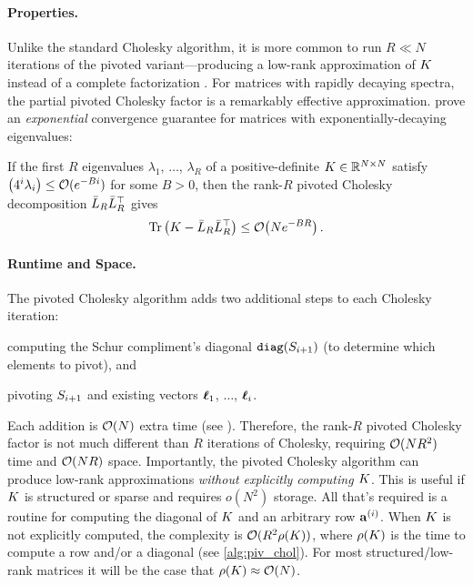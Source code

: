 \paragraph{Properties.}
Unlike the standard Cholesky algorithm, it is more common to run $R \ll N$ iterations of the pivoted variant---producing a low-rank approximation of $K$ instead of a complete factorization \cite{harbrecht2012low}.
For matrices with rapidly decaying spectra, the partial pivoted Cholesky factor is a remarkably effective approximation.
\citet{harbrecht2012low} prove an \emph{exponential} convergence guarantee for matrices with exponentially-decaying eigenvalues:
%
\begin{theorem}
\label{thm:harbrecht}
  If the first $R$ eigenvalues $\lambda_1$, $\ldots$, $\lambda_R$ of a positive-definite $K \in \mathbb{R}^{N \times N}$ satisfy $\left( 4^{i}\lambda_{i} \right) \leq \bigo{e^{-Bi}}$ for some $B>0$,
  then the rank-$R$ pivoted Cholesky decomposition $\bar{L}_{R} \bar{L}_R^\top$ gives
  \[
    \tr{\bK -  \bar\bL_R \bar\bL_R^\top} \leq \bigo{N e^{-BR}}.
  \]
\end{theorem}


\paragraph{Runtime and Space.}
The pivoted Cholesky algorithm adds two additional steps to each Cholesky iteration:
%
\begin{enumerate*}
  \item computing the Schur compliment's diagonal $\texttt{diag}(S_{i+1})$ (to determine which elements to pivot), and
  \item pivoting $S_{i+1}$ and existing vectors $\boldsymbol{\ell}_1$, $\ldots$, $\boldsymbol{\ell}_i$.
\end{enumerate*}
%
Each addition is $\bigo{N}$ extra time (see \citep[][Thm. 1]{harbrecht2012low}).
Therefore, the rank-$R$ pivoted Cholesky factor is not much different than $R$ iterations of Cholesky, requiring $\bigo{N R^2}$ time and $\bigo{NR}$ space.
Importantly, the pivoted Cholesky algorithm can produce low-rank approximations \emph{without explicitly computing $K$}.
This is useful if $K$ is structured or sparse and requires $o(N^2)$ storage.
All that's required is a routine for computing the diagonal of $K$ and an arbitrary row $\mathbf{a}^{(i)}$.
When $K$ is not explicitly computed, the complexity is $\bigo{R^2 \row{\bK}}$, where $\rho ( K )$ is the time to compute a row and/or a diagonal (see \cref{alg:piv_chol}).
For most structured/low-rank matrices it will be the case that $\row{\bK} \approx \bigo{N}$.



\clearpage
